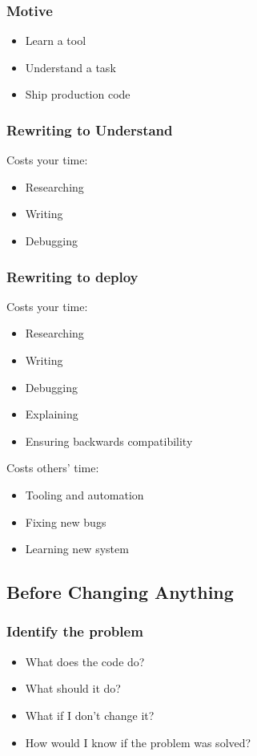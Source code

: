 \documentclass{beamer}
\begin{document}
\begin{frame}[fragile]
\frametitle{Motive}
\begin{itemize}
\item Learn a tool
\item Understand a task
\item Ship production code
\end{itemize}
\end{frame}

\begin{frame}[fragile]
\frametitle{Rewriting to Understand}
Costs your time:
\begin{itemize}
\item Researching
\item Writing
\item Debugging
\end{itemize}
\end{frame}

\begin{frame}[fragile]
\frametitle{Rewriting to deploy}
Costs your time:
\begin{itemize}
\item Researching
\item Writing
\item Debugging
\item Explaining
\item Ensuring backwards compatibility
\end{itemize}
Costs others' time:
\begin{itemize}
\item Tooling and automation
\item Fixing new bugs
\item Learning new system
\end{itemize}
\end{frame}


\subsection{Before Changing Anything}
\begin{frame}[fragile]
\frametitle{Identify the problem}
\begin{itemize}
\item What does the code do?
\item What should it do?
\item What if I don't change it?
\item How would I know if the problem was solved?
\end{itemize}
\end{frame}
\end{document}
